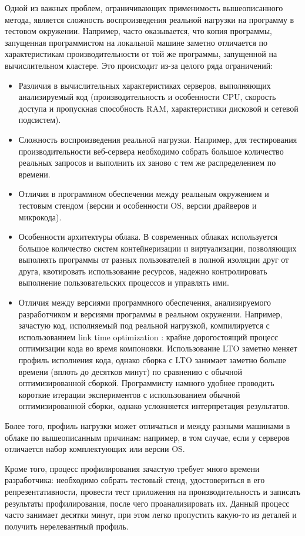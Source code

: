 Одной из важных проблем, ограничивающих применимость вышеописанного метода, является сложность воспроизведения реальной нагрузки на программу в тестовом окружении.
Например, часто оказывается, что копия программы, запущенная программистом на локальной машине заметно отличается по характеристикам производительности от той же программы, запущенной на вычислительном кластере.
Это происходит из-за целого ряда ограничений: 
\begin{itemize}
    \item Различия в вычислительных характеристиках серверов, выполняющих анализируемый код (производительность и особенности CPU, скорость доступа и пропускная способность RAM, характеристики дисковой и сетевой подсистем).
    \item Сложность воспроизведения реальной нагрузки. Например, для тестирования производительности веб-сервера необходимо собрать большое количество реальных запросов и выполнить их заново с тем же распределением по времени.
    \item Отличия в программном обеспечении между реальным окружением и тестовым стендом (версии и особенности OS, версии драйверов и микрокода).
    \item Особенности архитектуры облака. В современных облаках используется большое количество систем контейнеризации и виртуализации, позволяющих выполнять программы от разных пользователей в полной изоляции друг от друга, квотировать использование ресурсов, надежно контролировать выполнение пользовательских процессов и управлять ими.
    \item Отличия между версиями программного обеспечения, анализируемого разработчиком и версиями программы в реальном окружении. Например, зачастую код, исполняемый под реальной нагрузкой, компилируется с использованием link time optimization : крайне дорогостоящий процесс оптимизации кода во время компоновки. Использование LTO заметно меняет профиль исполнения кода, однако сборка с LTO занимает заметно больше времени (вплоть до десятков минут) по сравнению с обычной оптимизированной сборкой. Программисту намного удобнее проводить короткие итерации экспериментов с использованием обычной оптимизированной сборки, однако усложняется интерпретация результатов.
\end{itemize}
Более того, профиль нагрузки может отличаться и между разными машинами в облаке по вышеописанным причинам: например, в том случае, если у серверов отличается набор комплектующих или версии OS.

Кроме того, процесс профилирования зачастую требует много времени разработчика: необходимо собрать тестовый стенд, удостовериться в его репрезентативности, провести тест приложения на производительность и записать результаты профилирования, после чего проанализировать их. Данный процесс часто занимает десятки минут, при этом легко пропустить какую-то из деталей и получить нерелевантный профиль.

